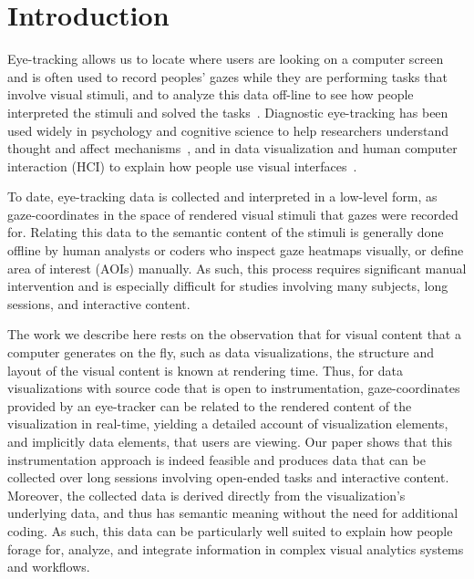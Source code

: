 \section{Introduction}

Eye-tracking allows us to locate where users are looking on a computer screen~\cite{ware1987evaluation,jacob1991use} and is often used to record peoples' gazes while they are performing tasks that involve visual stimuli, and to analyze this data off-line to see how people interpreted the stimuli and solved the tasks~\cite{duchowski2007eye}. Diagnostic eye-tracking has been used widely in psychology and cognitive science to help researchers understand thought and affect mechanisms~\cite{rayner1995eye}, and in data visualization and human computer interaction (HCI) to explain how people use visual interfaces~\cite{duchowski2007eye}. 

To date, eye-tracking data is collected and interpreted in a low-level form, as gaze-coordinates in the space of rendered visual stimuli that gazes were recorded for. Relating this data to the semantic content of the stimuli is generally done offline by human analysts or coders who inspect gaze heatmaps visually, or define area of interest (AOIs) manually. As such, this process requires significant manual intervention and is especially difficult for studies involving many subjects, long sessions, and interactive content.

The work we describe here rests on the observation that for visual content that a computer generates on the fly, such as data visualizations, the structure and layout of the visual content is known at rendering time. Thus, for data visualizations with source code that is open to instrumentation, gaze-coordinates provided by an eye-tracker can be related to the rendered content of the visualization in real-time, yielding a detailed account of visualization elements, and implicitly data elements, that users are viewing. Our paper shows that this instrumentation approach is indeed feasible and produces data that can be collected over long sessions involving open-ended tasks and interactive content. Moreover, the collected data is derived directly from the visualization's underlying data, and thus has semantic meaning without the need for additional coding. As such, this data can be particularly well suited to explain how people forage for, analyze, and integrate information in complex visual analytics systems and workflows. 

